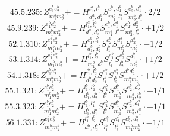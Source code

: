 \documentclass[letterpaper,10pt,fleqn,leqno,onecolumn]{article}
\begin{document}
\begin{equation} \;\;\;\;\;\;  45.5.235: Z^{e_{1}^{b}e_{2}^{b}}_{m_{1}^{b}m_{2}^{b}}+=H^{l_{1}^{a},l_{1}^{b}}_{d_{1}^{a},d_{1}^{b}}S^{e_{1}^{b},d_{1}^{a}}_{m_{1}^{b},l_{1}^{a}}S^{e_{2}^{b},d_{1}^{b}}_{m_{2}^{b},l_{1}^{b}}\cdot 2/2 \end{equation}
\begin{equation} \;\;\;\;\;\;  45.9.239: Z^{e_{1}^{b}e_{2}^{b}}_{m_{1}^{b}m_{2}^{b}}+=H^{l_{1}^{a},l_{2}^{a}}_{d_{1}^{a},d_{2}^{a}}S^{e_{1}^{b},d_{1}^{a}}_{m_{1}^{b},l_{1}^{a}}S^{e_{2}^{b},d_{2}^{a}}_{m_{2}^{b},l_{2}^{a}}\cdot +1/2 \end{equation}
\begin{equation} \;\;\;\;\;\;  52.1.310: Z^{e_{1}^{b}e_{2}^{b}}_{m_{1}^{b}m_{2}^{b}}+=H^{e_{1}^{b},l_{1}^{b}}_{d_{1}^{b},d_{2}^{b}}S^{e_{2}^{b}}_{l_{1}^{b}}S^{d_{1}^{b}}_{m_{1}^{b}}S^{d_{2}^{b}}_{m_{2}^{b}}\cdot -1/2 \end{equation}
\begin{equation} \;\;\;\;\;\;  53.1.314: Z^{e_{1}^{b}e_{2}^{b}}_{m_{1}^{b}m_{2}^{b}}+=H^{l_{1}^{b},l_{2}^{b}}_{m_{1}^{b},d_{1}^{b}}S^{e_{1}^{b}}_{l_{1}^{b}}S^{e_{2}^{b}}_{l_{2}^{b}}S^{d_{1}^{b}}_{m_{2}^{b}}\cdot +1/2 \end{equation}
\begin{equation} \;\;\;\;\;\;  54.1.318: Z^{e_{1}^{b}e_{2}^{b}}_{m_{1}^{b}m_{2}^{b}}+=H^{l_{1}^{b},l_{2}^{b}}_{d_{1}^{b}d_{2}^{b}}S^{e_{1}^{b}}_{l_{1}^{b}}S^{e_{2}^{b}}_{l_{2}^{b}}S^{d_{1}^{b}d_{2}^{b}}_{m_{1}^{b}m_{2}^{b}}\cdot +1/2 \end{equation}
\begin{equation} \;\;\;\;\;\;  55.1.321: Z^{e_{1}^{b}e_{2}^{b}}_{m_{1}^{b}m_{2}^{b}}+=H^{l_{1}^{b},l_{2}^{b}}_{d_{1}^{b},d_{2}^{b}}S^{e_{1}^{b}}_{l_{1}^{b}}S^{d_{1}^{b}}_{m_{1}^{b}}S^{e_{2}^{b},d_{2}^{b}}_{m_{2}^{b},l_{2}^{b}}\cdot -1/1 \end{equation}
\begin{equation} \;\;\;\;\;\;  55.3.323: Z^{e_{1}^{b}e_{2}^{b}}_{m_{1}^{b}m_{2}^{b}}+=H^{l_{1}^{b},l_{1}^{a}}_{d_{1}^{b},d_{1}^{a}}S^{e_{1}^{b}}_{l_{1}^{b}}S^{d_{1}^{b}}_{m_{1}^{b}}S^{e_{2}^{b},d_{1}^{a}}_{m_{2}^{b},l_{1}^{a}}\cdot -1/1 \end{equation}
\begin{equation} \;\;\;\;\;\;  56.1.331: Z^{e_{1}^{b}e_{2}^{b}}_{m_{1}^{b}m_{2}^{b}}+=H^{l_{1}^{b},l_{2}^{b}}_{d_{1}^{b},d_{2}^{b}}S^{e_{1}^{b}}_{l_{1}^{b}}S^{d_{1}^{b}}_{l_{2}^{b}}S^{e_{2}^{b},d_{2}^{b}}_{m_{1}^{b}m_{2}^{b}}\cdot -1/1 \end{equation}
\end{document}
